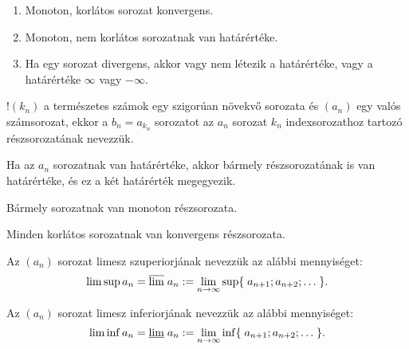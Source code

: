 \begin{statement}
  \begin{enumerate}
    \item Monoton, korlátos sorozat konvergens.
    \item Monoton, nem korlátos sorozatnak van határértéke.
    \item Ha egy sorozat divergens, akkor vagy nem létezik a határértéke, vagy a
          határértéke $\infty$ vagy $-\infty$.
  \end{enumerate}
\end{statement}

\begin{definition}[Részsorozat]
  $!(k_n)$ a természetes számok egy szigorúan növekvő sorozata és $(a_n)$ egy
  valós számsorozat, ekkor a $b_n = a_{k_n}$ sorozatot az $a_n$ sorozat $k_n$
  indexsorozathoz tartozó részsorozatának nevezzük.
\end{definition}

\begin{theorem}
  Ha az $a_n$ sorozatnak van határértéke, akkor bármely részsorozatának is van
  határértéke, és ez a két határérték megegyezik.
\end{theorem}

\begin{theorem}
  Bármely sorozatnak van monoton részsorozata.
\end{theorem}

\begin{theorem}
  Minden korlátos sorozatnak van konvergens részsorozata.
\end{theorem}

\begin{definition}
  Az $(a_n)$ sorozat limesz szuperiorjának nevezzük az alábbi mennyiséget:
  \[
    \lim \sup a_n
    = \overline{\lim} \; a_n
    := \lim_{n \rightarrow \infty} \sup \{\;
    a_{n + 1}; a_{n + 2}; \dots
    \;\}
    \text.
  \]

  Az $(a_n)$ sorozat limesz inferiorjának nevezzük az alábbi mennyiséget:
  \[
    \lim \inf a_n
    = \underline{\lim} \; a_n
    := \lim_{n \rightarrow \infty} \inf \{\;
    a_{n + 1}; a_{n + 2}; \dots
    \;\}
    \text.
  \]
\end{definition}


